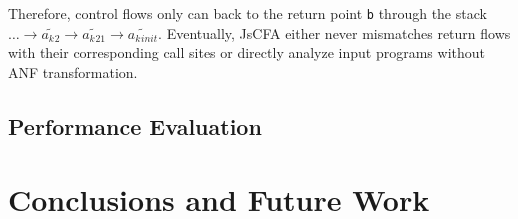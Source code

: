 \documentclass{article}
\begin{document}
Therefore, control flows only can back to the return point \verb|b| through the stack $\dots \to \widetilde{a_k{}_{2}} \to \widetilde{a_k{}_{21}} \to \widetilde{a_k{}_{init}}$. Eventually, JsCFA either never mismatches return flows with their corresponding call sites or directly analyze input programs without ANF transformation.

\subsection{Performance Evaluation}
\label{sub:Performance Evaluation}


\section{Conclusions and Future Work}
\label{sec:Future}

\clearpage


\end{document}
